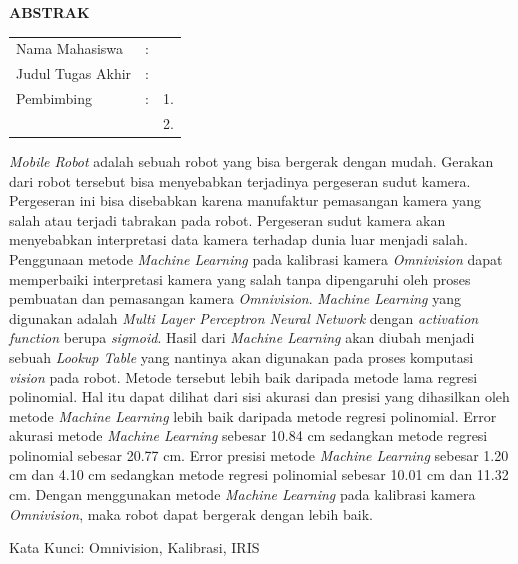 \begin{center}
  \large\textbf{ABSTRAK}
\end{center}


\vspace{2ex}

\begingroup
\setlength{\tabcolsep}{0pt}

\noindent
\begin{tabularx}{\textwidth}{l >{\centering}m{2em} X}
  Nama Mahasiswa    & : & \name{}         \\

  Judul Tugas Akhir & : & \tatitle{}      \\

  Pembimbing        & : & 1. \advisor{}   \\
                    &   & 2. \coadvisor{} \\
\end{tabularx}
\endgroup

\emph{Mobile Robot} adalah sebuah robot yang bisa bergerak dengan mudah. Gerakan dari robot tersebut bisa menyebabkan terjadinya pergeseran sudut kamera. Pergeseran ini bisa disebabkan karena manufaktur pemasangan kamera yang salah atau terjadi tabrakan pada robot. Pergeseran sudut kamera akan menyebabkan interpretasi data kamera terhadap dunia luar menjadi salah. Penggunaan metode \emph{Machine Learning} pada kalibrasi kamera \emph{Omnivision} dapat memperbaiki interpretasi kamera yang salah tanpa dipengaruhi oleh proses pembuatan dan pemasangan kamera \emph{Omnivision}. \emph{Machine Learning} yang digunakan adalah \emph{Multi Layer Perceptron Neural Network} dengan \emph{activation function} berupa \emph{sigmoid}. Hasil dari \emph{Machine Learning} akan diubah menjadi sebuah \emph{Lookup Table} yang nantinya akan digunakan pada proses komputasi \emph{vision} pada robot. Metode tersebut lebih baik daripada metode lama regresi polinomial. Hal itu dapat dilihat dari sisi akurasi dan presisi yang dihasilkan oleh metode \emph{Machine Learning} lebih baik daripada metode regresi polinomial. Error akurasi metode \emph{Machine Learning} sebesar 10.84 cm sedangkan metode regresi polinomial sebesar 20.77 cm. Error presisi metode \emph{Machine Learning} sebesar 1.20 cm dan 4.10 cm sedangkan metode regresi polinomial sebesar 10.01 cm dan 11.32 cm. Dengan menggunakan metode \emph{Machine Learning} pada kalibrasi kamera \emph{Omnivision}, maka robot dapat bergerak dengan lebih baik. 

Kata Kunci: Omnivision, Kalibrasi, IRIS

